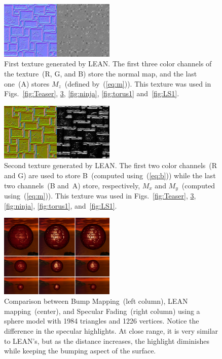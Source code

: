 \documentclass[10pt, conference]{IEEEtran}
\begin{document}
\begin{figure}[t]
	\includegraphics[width=0.49\textwidth]{figs/Lean1.png}
	\caption{First texture generated by LEAN. The first three color channels of the texture~(R, G, and B) store the normal map, and the last one~(A) stores $M_z$~(defined by~(\ref{eq:m})). This texture was used in Figs.~\ref{fig:Teaser}, \ref{fig:sphere}, \ref{fig:ninja}, \ref{fig:torus1} and~\ref{fig:LS1}.}
	\label{fig:Lean1}
\end{figure}

\begin{figure}[t]
	\includegraphics[width=0.49\textwidth]{figs/Lean2.png}
	\caption{Second texture generated by LEAN. The first two color channels~(R and G) are used to store B~(computed using~(\ref{eq:b})) while the last two channels~(B and~A) store, respectively, $M_x$ and $M_y$~(computed using~(\ref{eq:m})). This texture was used in Figs.~\ref{fig:Teaser}, \ref{fig:sphere}, \ref{fig:ninja}, \ref{fig:torus1}, and~\ref{fig:LS1}.}
	\label{fig:Lean2}
\end{figure}

\begin{figure}[t]
	\includegraphics[width=0.49\textwidth]{figs/sphere.png}
	\caption{Comparison between Bump Mapping~(left column), LEAN mapping~(center), and Specular Fading~(right column) using a sphere model with 1984 triangles and 1226 vertices. Notice the difference in the specular highlights. At close range, it is very similar to LEAN's, but as the distance increases, the highlight diminishes while keeping the bumping aspect of the surface.}
	\label{fig:sphere}
\end{figure}
\end{document}
